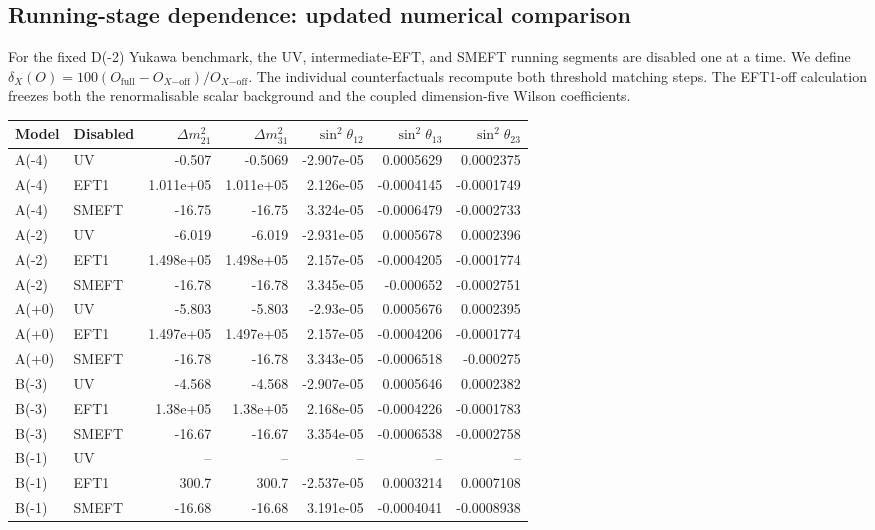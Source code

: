 \subsection*{Running-stage dependence: updated numerical comparison}
For the fixed D(-2) Yukawa benchmark, the
UV, intermediate-EFT, and SMEFT running segments are disabled one at a time.
We define $\delta_X(O)=100(O_{\mathrm{full}}-O_{X\mathrm{-off}})/O_{X\mathrm{-off}}$.
The individual counterfactuals recompute both threshold matching steps.
The EFT1-off calculation freezes both the renormalisable scalar background and
the coupled dimension-five Wilson coefficients.
\begin{table}[htbp]
\centering
\scriptsize
\begin{tabular}{llrrrrr}
\hline
Model & Disabled & $\Delta m^2_{21}$ & $\Delta m^2_{31}$ & $\sin^2\theta_{12}$ & $\sin^2\theta_{13}$ & $\sin^2\theta_{23}$ \\
\hline
A(-4) & UV & -0.507 & -0.5069 & -2.907e-05 & 0.0005629 & 0.0002375 \\
A(-4) & EFT1 & 1.011e+05 & 1.011e+05 & 2.126e-05 & -0.0004145 & -0.0001749 \\
A(-4) & SMEFT & -16.75 & -16.75 & 3.324e-05 & -0.0006479 & -0.0002733 \\
A(-2) & UV & -6.019 & -6.019 & -2.931e-05 & 0.0005678 & 0.0002396 \\
A(-2) & EFT1 & 1.498e+05 & 1.498e+05 & 2.157e-05 & -0.0004205 & -0.0001774 \\
A(-2) & SMEFT & -16.78 & -16.78 & 3.345e-05 & -0.000652 & -0.0002751 \\
A(+0) & UV & -5.803 & -5.803 & -2.93e-05 & 0.0005676 & 0.0002395 \\
A(+0) & EFT1 & 1.497e+05 & 1.497e+05 & 2.157e-05 & -0.0004206 & -0.0001774 \\
A(+0) & SMEFT & -16.78 & -16.78 & 3.343e-05 & -0.0006518 & -0.000275 \\
B(-3) & UV & -4.568 & -4.568 & -2.907e-05 & 0.0005646 & 0.0002382 \\
B(-3) & EFT1 & 1.38e+05 & 1.38e+05 & 2.168e-05 & -0.0004226 & -0.0001783 \\
B(-3) & SMEFT & -16.67 & -16.67 & 3.354e-05 & -0.0006538 & -0.0002758 \\
B(-1) & UV & -- & -- & -- & -- & -- \\
B(-1) & EFT1 & 300.7 & 300.7 & -2.537e-05 & 0.0003214 & 0.0007108 \\
B(-1) & SMEFT & -16.68 & -16.68 & 3.191e-05 & -0.0004041 & -0.0008938 \\

\end{tabular}
\end{table}
